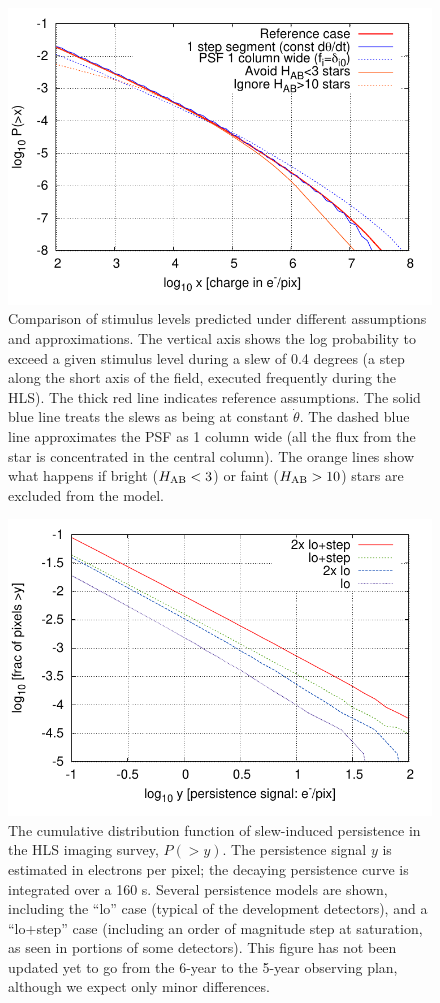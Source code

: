 \begin{figure}
\includegraphics[width=5in]{Plots/slew_compare.pdf}
\caption{\label{fig:slewcompare}Comparison of stimulus levels predicted
under different assumptions and approximations. The vertical axis
shows the log probability to exceed a given stimulus level during a
slew of 0.4 degrees (a step along the short axis of the field,
executed frequently during the HLS). The thick red line indicates
reference assumptions. The solid blue line treats the slews as being
at constant $\dot\theta$. The dashed blue line approximates the PSF as
1 column wide (all the flux from the star is concentrated in the
central column). The orange lines show what happens if bright ($H_{\rm
AB}<3$) or faint ($H_{\rm AB}>10$) stars are excluded from the model.}
\end{figure}

\begin{figure}
\includegraphics[width=5in]{Plots/sp_cdf.pdf}
\caption{\label{fig:sp_cdf}The cumulative distribution function of slew-induced persistence in the HLS imaging survey, $P(>y)$.
The persistence signal $y$ is estimated in electrons per pixel; the decaying persistence curve is integrated over a 160 s. Several persistence models are shown, including the ``lo'' case (typical of the development detectors), and a ``lo+step'' case (including an order of magnitude step at saturation, as seen in portions of some detectors). This figure has not been updated yet to go from the 6-year to the 5-year observing plan, although we expect only minor differences.}
\end{figure}

